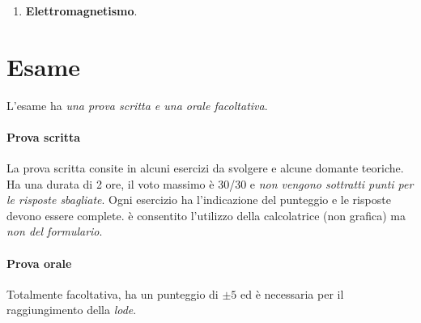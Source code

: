 \documentclass[12pt, a4paper, openany]{book}
\begin{document}
\begin{enumerate}
    \item \textbf{Elettromagnetismo}.
    \small{}
\end{enumerate}

\section{Esame}
L'esame ha \emph{una prova scritta e una orale facoltativa}.
\paragraph*{Prova scritta}
La prova scritta consite in alcuni esercizi da svolgere e alcune domante teoriche.
Ha una durata di 2 ore, il voto massimo è 30/30 e \emph{non vengono sottratti punti per le risposte sbagliate}. 
Ogni esercizio ha l'indicazione del punteggio e le risposte devono essere complete.
è consentito l'utilizzo della calcolatrice (non grafica) ma \emph{non del formulario}.
\paragraph*{Prova orale}
Totalmente facoltativa, ha un punteggio di $\pm 5$ ed è necessaria per il raggiungimento della \emph{lode}.
\end{document}
